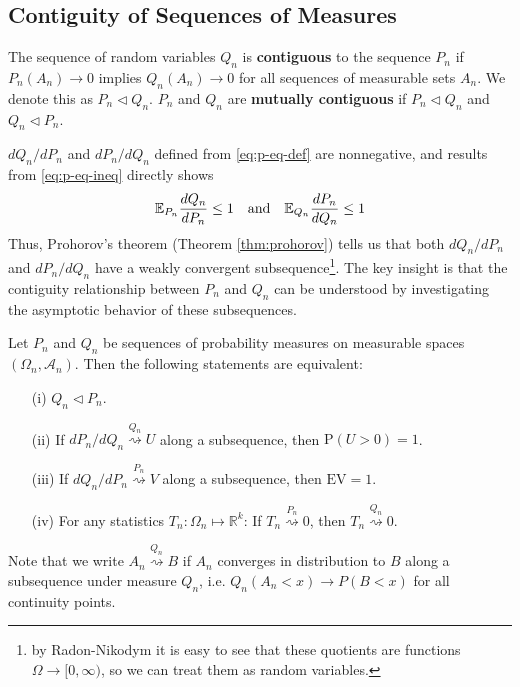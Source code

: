 \documentclass{article}
\begin{document}
\subsection{Contiguity of Sequences of Measures}
\begin{definition}
    The sequence of random variables $Q_n$ is \textbf{contiguous} to the sequence $P_n$ if $P_n(A_n) \to 0$ implies $Q_n(A_n) \to 0$ for all sequences of measurable sets $A_n$. We denote this as $P_n \triangleleft Q_n$. $P_n$ and $Q_n$ are \textbf{mutually contiguous} if $P_n \triangleleft Q_n$ and $Q_n \triangleleft P_n$.
\end{definition}
$dQ_n/dP_n$ and $dP_n/dQ_n$ defined from \ref{eq:p-eq-def} are nonnegative, and results from \ref{eq:p-eq-ineq} directly shows
\begin{equation}
    \mathbb{E}_{P_n} \frac{dQ_n}{dP_n} \leq 1 \quad \text{and} \quad \mathbb{E}_{Q_n} \frac{dP_n}{dQ_n} \leq 1
\end{equation}
Thus, Prohorov's theorem (Theorem \ref{thm:prohorov}) tells us that both $dQ_n/dP_n$ and $dP_n/dQ_n$ have a weakly convergent subsequence\footnote{by Radon-Nikodym it is easy to see that these quotients are functions $\Omega \to [0, \infty)$, so we can treat them as random variables.}. The key insight is that the contiguity relationship between $P_n$ and $Q_n$ can be understood by investigating the asymptotic behavior of these subsequences.
\begin{lemma}\label{lemma:lecam1}
    Let \(P_n\) and \(Q_n\) be sequences of probability measures on measurable spaces \((\Omega_n, \mathcal{A}_n)\). Then the following statements are equivalent:
    \begin{enumerate}
        \item[(i)] \(Q_n \triangleleft P_n\).
        \item[(ii)] If \(dP_n/dQ_n \overset{Q_n}{\rightsquigarrow} U\) along a subsequence, then \(\text{P}(U > 0) = 1\).
        \item[(iii)] If \(dQ_n/dP_n \overset{P_n}{\rightsquigarrow} V\) along a subsequence, then \(\text{EV} = 1\).
        \item[(iv)] For any statistics \(T_n : \Omega_n \mapsto \mathbb{R}^k\): If \(T_n \overset{P_n}{\rightsquigarrow} 0\), then \(T_n \overset{Q_n}{\rightsquigarrow} 0\).
    \end{enumerate}
\end{lemma}
Note that we write $A_n \overset{Q_n}{\rightsquigarrow} B$ if $A_n$ converges in distribution to $B$ along a subsequence under measure $Q_n$, i.e. $Q_n(A_n < x) \to P(B < x)$ for all continuity points.
\end{document}
